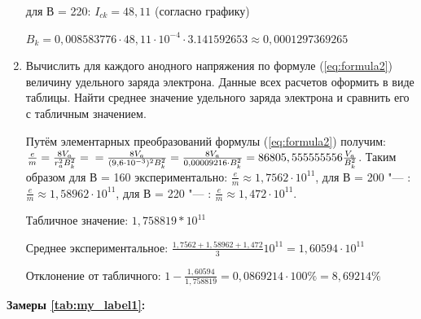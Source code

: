 \begin{enumerate}
    для В = 220: $I_{ck} = 48,11$ (согласно графику)
    
    $B_k = 0,008583776 \cdot 48,11 \cdot 10^{-4} \cdot 3.141592653 \approx 0,0001297369265$
    
    \item{ Вычислить для каждого анодного напряжения по формуле (\ref{eq:formula2}) величину удельного заряда электрона. Данные всех расчетов оформить в виде таблицы. Найти среднее значение удельного заряда электрона и сравнить его с табличным значением. }

    Путём элементарных преобразований формулы (\ref{eq:formula2}) получим: $\frac{e}{m} = \frac{8 V_a}{r^2_a B^2_k} = \\ = \frac{8 V_a}{(9,6 \cdot 10^{-3})^2 B^2_k} = \frac{8 V_a}{0,00009216 \cdot B^2_k} = 86805,555555556\frac{V_a}{B^2_k}$.
    Таким образом для В = 160 экспериментально: $\frac{e}{m} \approx 1,7562 \cdot 10^{11}  $,
    для В = 200 "--- : $\frac{e}{m} \approx 1,58962 \cdot 10^{11} $,
    для В = 220 "--- : $\frac{e}{m} \approx 1,472 \cdot 10^{11} $.

    Табличное значение: $1,758819 * 10^{11}$

    Среднее экспериментальное: $\frac{1,7562 + 1,58962 + 1,472}{3}10^{11} = 1,60594\cdot10^{11}$

    Отклонение от табличного: $ 1 - \frac{1,60594}{1,758819} = 0,0869214 \cdot 100\% = 8,69214\%$
\end{enumerate}

\vspace{1cm}

\textbf{Замеры \ref{tab:my_label1}:}

